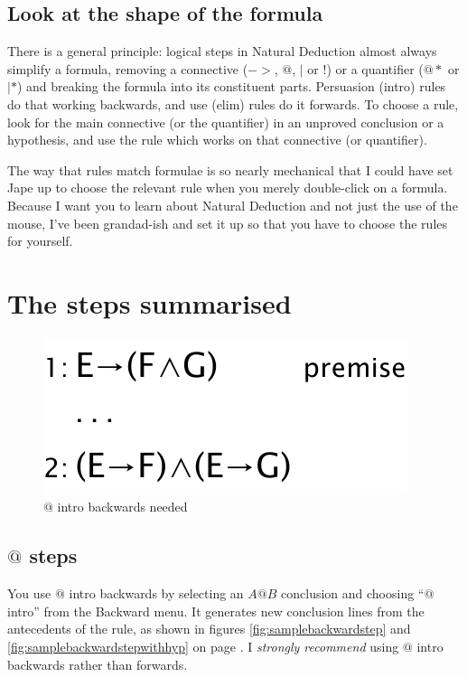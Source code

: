 \documentclass[11pt]{book}
\begin{document}
\section{Look at the shape of the formula}

There is a general principle: logical steps in Natural Deduction almost always simplify a formula, removing a connective ($->$, $@$, $|$ or $!$) or a quantifier ($@*$ or $|*$) and breaking the formula into its constituent parts. Persuasion (intro) rules do that working backwards, and use (elim) rules do it forwards. To choose a rule, look for the main connective (or the quantifier) in an unproved conclusion or a hypothesis, and use the rule which works on that connective (or quantifier).

The way that rules match formulae is so nearly mechanical that I could have set Jape up to choose the relevant rule when you merely double-click on a formula. Because I want you to learn about Natural Deduction and not just the use of the mouse, I've been grandad-ish and set it up so that you have to choose the rules for yourself.

\chapter{The steps summarised}

\begin{figure}
\centering
\includegraphics[scale=0.5]{pics/@introbackwardsworks}
\caption{$@$ intro backwards needed}
\label{fig:@introbackwardsworks}
\end{figure}

\section{$@$ steps}

You use $@$ intro backwards by selecting an $A@B$ conclusion and  choosing ``$@$ intro'' from the Backward menu. It generates new conclusion lines from the antecedents of the rule, as shown in figures \ref{fig:samplebackwardstep} and \ref{fig:samplebackwardstepwithhyp} on page \pageref{fig:samplebackwardstep}. I \emph{strongly recommend} using $@$ intro backwards rather than forwards.
\end{document}
